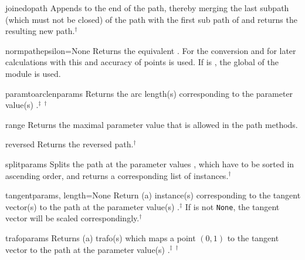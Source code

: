 \begin{methoddesc}{joined}{opath}
  Appends  to the end of the path, thereby merging the last
  subpath (which must not be closed) of the path with the first sub
  path of  and returns the resulting new path.$^\dagger$
\end{methoddesc}

\begin{methoddesc}{normpath}{epsilon=None}
  Returns the equivalent . For the conversion and for later
  calculations with this  and accuracy of
   points is used. If  is , the
  global  of the  module is used. 
\end{methoddesc}

\begin{methoddesc}{paramtoarclen}{params}
  Returns the arc length(s) corresponding to the parameter value(s)
  .$^\ddagger$ $^\dagger$
\end{methoddesc}


\begin{methoddesc}{range}{}
  Returns the maximal parameter value  that is allowed in the
  path methods. 
\end{methoddesc}

\begin{methoddesc}{reversed}{}
  Returns the reversed path.$^\dagger$
\end{methoddesc}

\begin{methoddesc}{split}{params}
  Splits the path at the parameter values , which have to
  be sorted in ascending order, and returns a corresponding list of
   instances.$^\dagger$
\end{methoddesc}

\begin{methoddesc}{tangent}{params, length=None}
  Return (a)  instance(s) corresponding to the tangent
  vector(s) to the path at the parameter value(s)
  .$^\ddagger$ If  is not \texttt{None}, the
  tangent vector will be scaled correspondingly.$^\dagger$
\end{methoddesc}


\begin{methoddesc}{trafo}{params}
  Returns (a) trafo(s) which maps a point $(0, 1)$ to the tangent vector to
  the path at the parameter value(s) .$^\ddagger$ $^\dagger$
\end{methoddesc}

